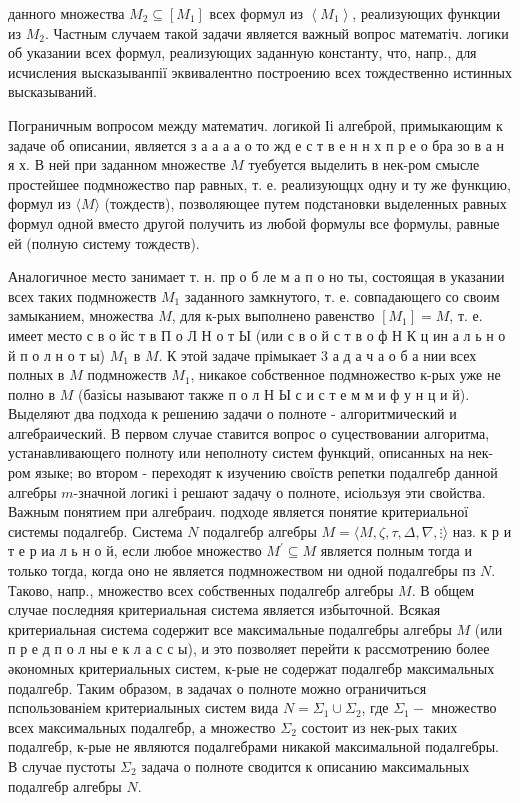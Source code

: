 \documentclass[10pt]{article}
\begin{document}
данного множества $M_{2} \subseteq\left[M_{1}\right]$ всех формул из $\left\langle M_{1}\right\rangle$, реализующих функции из $M_{2}$. Частным случаем такой задачи является важный вопрос математіч. логики об указании всех формул, реализующих заданную константу, что, напр., для исчисления высказыванпії эквивалентно построению всех тождественно истинных высказываний.



Пограничным вопросом между математич. логикой Іі алгеброй, примыкающим к задаче об описании, является з а а а а о то жд е с т в е н н х п р е о бра зо в а н я х. В ней при заданном множестве $M$ туебуется выделить в нек-ром смысле простейшее подмножество пар равных, т. е. реализующцх одну и ту же функцию, формул из $\langle M\rangle$ (тождеств), позволяющее путем подстановки выделенных равных формул одной вместо другой получить из любой формулы все формулы, равные ей (полную систему тождеств).



Аналогичное место занимает т. н. пр о б ле м а п о но ты, состоящая в указании всех таких подмножеств $M_{1}$ заданного замкнутого, т. е. совпадающего со своим замыканием, множества $M$, для к-рых выполнено равенство $\left[M_{1}\right]=M$, т. е. имеет место с в о йс т в П о Л Н о т Ы (или с в о й с т в о ф Н К ц ин а л ь н о й п о л н о т ы) $M_{1}$ в $M$. К этой задаче прімыкает 3 а д а ч а о б а нии всех полных в $M$ подмножеств $M_{1}$, никакое собственное подмножество к-рых уже не полно в $M$ (базісы называют также п о л Н Ы с и с т е м м и ф у н ц и й). Выделяют два подхода к решению задачи о полноте - алгоритмический и алгебраический. В первом случае ставится вопрос о суцествовании алгоритма, устанавливающего полноту или неполноту систем функций, описанных на нек-ром языке; во втором - переходят к изучению своїств репетки подалгебр данной алгебры $m$-значной логикі і решают задачу о полноте, исіользуя эти свойства. Важным понятием при алгебраич. подходе является понятие критериальної системы подалгебр. Система $N$ подалгебр алгебры $M=\langle M, \zeta, \tau, \Delta, \nabla, \vdots\rangle$ наз. к р и т е р иа л ь н о й, если любое множество $M^{\prime} \subseteq M$ является полным тогда и только тогда, когда оно не является подмножеством ни одной подалгебры пз $N$. Таково, напр., множество всех собственных подалгебр алгебры $M$. В общем случае последняя критериальная система является избыточной. Всякая критериальная система содержит все максимальные подалгебры алгебры $M$ (или п р е д п о л ны е к л а с с ы), и это позволяет перейти к рассмотрению более әкономных критериальных систем, к-рые не содержат подалгебр максимальных подалгебр. Таким образом, в задачах о полноте можно ограничиться пспользованіем критериалыных систем вида $N=\Sigma_{1} \cup \Sigma_{2}$, где $\Sigma_{1}-$ множество всех максимальных подалгебр, а множество $\Sigma_{2}$ состоит из нек-рых таких подалгебр, к-рые не являются подалгебрами никакой максимальной подалгебры. В случае пустоты $\Sigma_{2}$ задача о полноте сводится к описанию максимальных подалгебр алгебры $N$.
\end{document}
